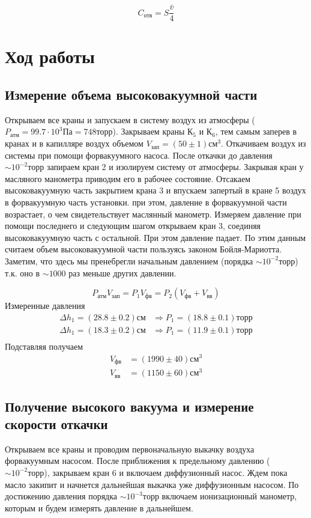 \documentclass{article}
\begin{document}
    \begin{equation}
    C_{отв}=S\frac{\bar v}{4}
    \end{equation}

    \section{Ход работы}

    \subsection{Измерение объема высоковакуумной части}

    Открываем все краны и запускаем в систему воздух из атмосферы ($P_{атм}=99.7\cdot 10^3 Па=748торр$). Закрываем краны $К_5$ и $К_6$, тем самым заперев в кранах и в капилляре воздух объемом $V_{зап}=(50 \pm 1)см^3$. Откачиваем воздух из системы при помощи форвакуумного насоса. После откачки до давления $\sim 10^{-2} торр$ запираем кран 2 и изолируем систему от атмосферы. Закрывая кран у масляного манометра приводим его в рабочее состояние. Отсакаем высоковакуумную часть закрытием крана 3 и впускаем запертый в кране 5 воздух в форвакуумную часть установки. при этом, давление в форвакуумной части возрастает, о чем свидетельствует маслянный манометр. Измеряем давление при помощи последнего и следующим шагом открываем кран 3, соединяя высоковакуумную часть с остальной. При этом давление падает. По этим данным считаем объем высоковакуумной части пользуясь законом Бойля-Мариотта. Заметим, что здесь мы пренебрегли начальным давлением (порядка $\sim 10^{-2} торр$) т.к. оно в $\sim 1000$ раз меньше других давлении.


    \begin{equation*}
        P_{атм}V_{зап}=P_1V_{фв}=P_2(V_{фв}+V_{вв})
    \end{equation*}
    Измеренные давления
    \begin{align*}
        \Delta h_1=(28.8 \pm 0.2) см &\Rightarrow P_1=(18.8 \pm 0.1)торр \\
        \Delta h_1=(18.3 \pm 0.2) см &\Rightarrow P_1=(11.9 \pm 0.1)торр \\
    \end{align*}
    Подставляя получаем
    \begin{align}
        V_{фв} &= (1990 \pm 40)см^3\\
        V_{вв} &= (1150 \pm 60)см^3
    \end{align}

    \subsection{Получение высокого вакуума и измерение скорости откачки}
    Открываем все краны и проводим первоначальную выкачку воздуха форвакуумным насосом. После приближения к предельному давлению ($\sim 10^{-2}торр$), закрываем кран 6 и включаем диффузионный насос. Ждем пока масло закипит и начнется дальнейшая выкачка уже диффузионным насосом. По достижению давления порядка $\sim 10^{-3}торр$ включаем ионизационный манометр, которым и будем измерять давление в дальнейшем.
\end{document}
